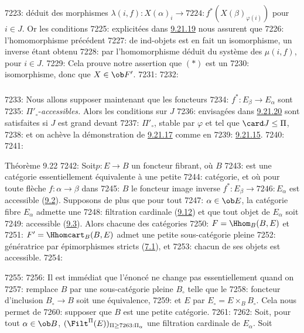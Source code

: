 7223: déduit des morphismes $\lambda(i,f):X(\alpha)_i\rightarrow
7224: f^\ast(X(\beta)_{\varphi(i)})$ pour $i\in J$. Or les conditions
7225: explicitées dans \hyperref[I.lem9.21.19]{9.21.19} nous assurent que
7226: l'homomorphisme précédent
7227: de ind-objets est en fait un isomorphisme, un inverse étant obtenu
7228: par l'homomorphisme déduit du système des $\mu(i,f)$, pour $i\in J$.
7229: Cela prouve notre assertion que $(\ast)$ est un %
7230: isomorphisme, donc que $X\in \ob F'$.
7231: 
7232: \subsubsection{}
7233: Nous allons supposer maintenant que les foncteurs
7234: $f^\ast:E_{\beta}\rightarrow E_{\alpha}$ sont
7235: $\Pi'_{\circ}$-\emph{accessibles.} Alors les conditions sur $J$
7236: envisagées dans \hyperref[I.sec9.21.20]{9.21.20} sont satisfaites si $J$ est grand devant
7237: $\Pi'_{\circ}$, stable par $\varphi$ et tel que $\card J\leq \Pi$,
7238: et on achève la démonstration de \hyperref[I.lem9.21.17]{9.21.17} comme en
7239: \hyperref[I.sec9.21.15]{9.21.15}.
7240: 
7241: \begin{enonce*}{Théorème 9.22}
7242: Soit\pageoriginale $p:E\rightarrow B$ un foncteur fibrant, où $B$
7243: est une catégorie essentiellement équivalente à une petite
7244: catégorie, et où pour toute flèche $f:\alpha\rightarrow \beta$ dans
7245: $B$ le foncteur image inverse $f^\ast:E_{\beta}\rightarrow
7246: E_{\alpha}$ est accessible (\hyperref[I.def9.2]{9.2}). Supposons de plus que pour tout
7247: $\alpha\in \ob E$, la catégorie fibre $E_{\alpha}$ admette une
7248: filtration cardinale (\hyperref[I.def9.12]{9.12}) et que tout objet de $E_{\alpha}$ soit
7249: accessible (\hyperref[I.def9.3]{9.3}). Alors chacune des catégories
7250: $F=\Hhom_B(B,E)$ et
7251: $F'=\Hhomcart_B(B,E)$ admet une petite sous-catégorie pleine
7252: génératrice par épimorphismes stricts (\hyperref[I.def7.1]{7.1}), et
7253: chacun de ses objets est accessible.
7254: \end{enonce*}
7255: 
7256: Il est immédiat que l'énoncé ne change pas essentiellement quand on
7257: remplace $B$ par une sous-catégorie pleine $B_{\circ}$ telle que le
7258: foncteur d'inclusion $B_{\circ}\rightarrow B$ soit une équivalence,
7259: et $E$ par $E_{\circ}=E\times_B B_{\circ}$. Cela nous permet de
7260: supposer que $B$ est une petite catégorie.
7261: 
7262: Soit, pour tout $\alpha\in \ob B$, $(\Filt^{\Pi}(E))_{\Pi\geq
7263: \Pi_{\alpha}}$ une filtration cardinale de $E_{\alpha}$. Soit
